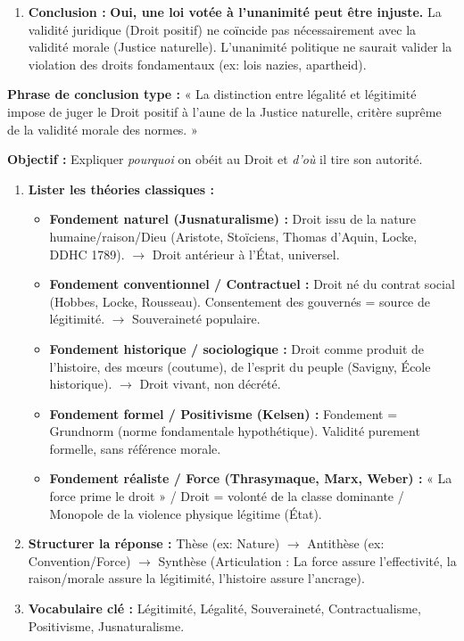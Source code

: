 \documentclass[11pt]{article}
\newcommand{\cle}[1]{{\popxbold\color{popdark}#1}}
\begin{document}
\begin{exoresolu}
\begin{enumerate}
\begin{itemize}
    \end{itemize}
    \item \textbf{Conclusion :} \textbf{Oui, une loi votée à l'unanimité peut être injuste.} La validité juridique (Droit positif) ne coïncide pas nécessairement avec la validité morale (Justice naturelle). L'unanimité politique ne saurait valider la violation des droits fondamentaux (ex: lois nazies, apartheid).
\end{enumerate}
\textbf{Phrase de conclusion type :} « La distinction entre légalité et légitimité impose de juger le Droit positif à l'aune de la Justice naturelle, critère suprême de la validité morale des normes. »
\end{exoresolu}

\begin{methode}
    \textbf{Objectif :} Expliquer \emph{pourquoi} on obéit au Droit et \emph{d'où} il tire son autorité.
    \begin{enumerate}
        \item \textbf{Lister les théories classiques :}
            \begin{itemize}
                \item \textbf{Fondement naturel (Jusnaturalisme) :} Droit issu de la nature humaine/raison/Dieu (Aristote, Stoïciens, Thomas d'Aquin, Locke, DDHC 1789). $\rightarrow$ Droit antérieur à l'État, universel.
                \item \textbf{Fondement conventionnel / Contractuel :} Droit né du \cle{contrat social} (Hobbes, Locke, Rousseau). Consentement des gouvernés = source de légitimité. $\rightarrow$ Souveraineté populaire.
                \item \textbf{Fondement historique / sociologique :} Droit comme produit de l'histoire, des mœurs (\cle{coutume}), de l'esprit du peuple (Savigny, École historique). $\rightarrow$ Droit vivant, non décrété.
                \item \textbf{Fondement formel / Positivisme (Kelsen) :} Fondement = \cle{Grundnorm} (norme fondamentale hypothétique). Validité purement formelle, sans référence morale.
                \item \textbf{Fondement réaliste / Force (Thrasymaque, Marx, Weber) :} « La force prime le droit » / Droit = volonté de la classe dominante / Monopole de la violence physique légitime (État).
            \end{itemize}
        \item \textbf{Structurer la réponse :} Thèse (ex: Nature) $\rightarrow$ Antithèse (ex: Convention/Force) $\rightarrow$ Synthèse (Articulation : La force assure l'effectivité, la raison/morale assure la légitimité, l'histoire assure l'ancrage).
        \item \textbf{Vocabulaire clé :} \cle{Légitimité}, \cle{Légalité}, \cle{Souveraineté}, \cle{Contractualisme}, \cle{Positivisme}, \cle{Jusnaturalisme}.
    \end{enumerate}
\end{methode}
\end{document}
